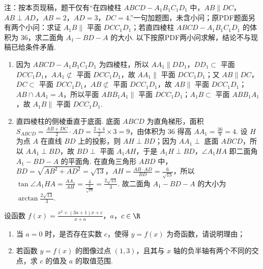 \begin{solution}
注：按本页现稿，题干仅有“在四棱柱 \(ABCD-A_1B_1C_1D_1\) 中，\(AB\parallel DC\)，\(AB\perp AD\)，\(AB=2\)，\(AD=3\)，\(DC=4\).”一句加题图，未含小问；原PDF题面另有两个小问：求证 \(A_1B\parallel\) 平面 \(DCC_1D_1\)；若直四棱柱 \(ABCD-A_1B_1C_1D_1\) 的体积为 \(36\)，求二面角 \(A_1-BD-A\) 的大小. 以下按原PDF两小问求解，结论不与现稿已给条件矛盾.
\begin{enumerate}
\item 因为 \(ABCD-A_1B_1C_1D_1\) 为四棱柱，所以 \(AA_1\parallel DD_1\)，\(DD_1\subset\) 平面 \(DCC_1D_1\)，\(AA_1\not\subset\) 平面 \(DCC_1D_1\)，故 \(AA_1\parallel\) 平面 \(DCC_1D_1\)；又 \(AB\parallel DC\)，\(DC\subset\) 平面 \(DCC_1D_1\)，\(AB\not\subset\) 平面 \(DCC_1D_1\)，故 \(AB\parallel\) 平面 \(DCC_1D_1\)；\(AB\cap AA_1=A\)，所以平面 \(ABB_1A_1\parallel\) 平面 \(DCC_1D_1\)；\(A_1B\subset\) 平面 \(ABB_1A_1\)，故 \(A_1B\parallel\) 平面 \(DCC_1D_1\).

\item 直四棱柱的侧棱垂直于底面. 底面 \(ABCD\) 为直角梯形，面积 \(S_{ABCD}=\frac{AB+DC}{2}\cdot AD=\frac{2+4}{2}\times 3=9\)，由体积为 \(36\) 得高 \(AA_1=\frac{36}{9}=4\). 设 \(H\) 为点 \(A\) 在直线 \(BD\) 上的投影，则 \(AH\perp BD\)；因为 \(AA_1\perp\) 底面 \(ABCD\)，所以 \(AA_1\perp BD\)，故 \(BD\perp\) 平面 \(A_1AH\)，于是 \(A_1H\perp BD\)，\(\angle A_1HA\) 即二面角 \(A_1-BD-A\) 的平面角. 在直角三角形 \(ABD\) 中，\(BD=\sqrt{AB^2+AD^2}=\sqrt{13}\)，\(AH=\frac{AB\cdot AD}{BD}=\frac{6}{\sqrt{13}}\)，所以 \(\tan\angle A_1HA=\frac{AA_1}{AH}=\frac{4}{\frac{6}{\sqrt{13}}}=\frac{2\sqrt{13}}{3}\). 故二面角 \(A_1-BD-A\) 的大小为 \(\arctan\frac{2\sqrt{13}}{3}\).
\end{enumerate}
\end{solution}

\begin{problem}
设函数 \(f(x)=\frac{x^2+(3a+1)x+c}{x+a}\)，\(a\)，\(c\in\R\)
\begin{enumerate}
\item 当 \(a=0\) 时，是否存在实数 \(c\)，使得 \(y=f(x)\) 为奇函数，请说明理由；
\item 若函数 \(y=f(x)\) 的图像过点 \((1,3)\)，且其与 \(x\) 轴的负半轴有两个不同的交点，求 \(c\) 的值及 \(a\) 的取值范围.
\end{enumerate}
\end{problem}

